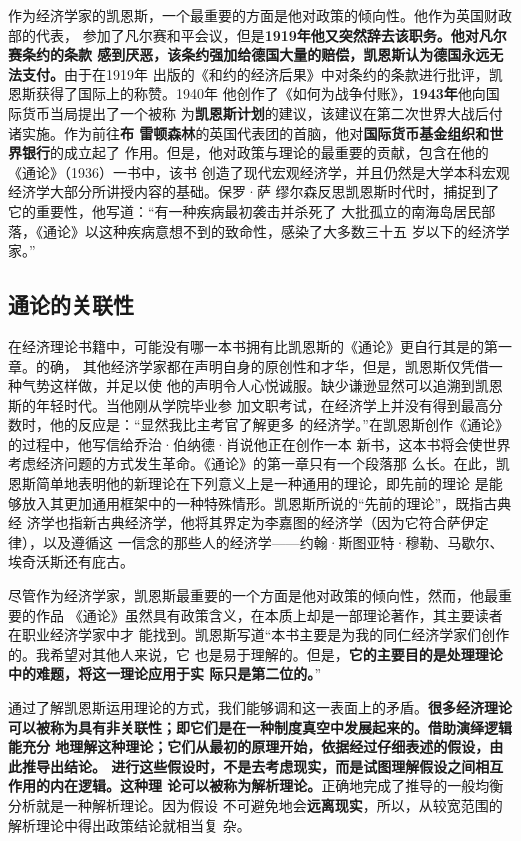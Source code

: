 作为经济学家的凯恩斯，一个最重要的方面是他对政策的倾向性。他作为英国财政部的代表，
参加了凡尔赛和平会议，但是\textbf{1919年他又突然辞去该职务。他对凡尔赛条约的条款
  感到厌恶，该条约强加给德国大量的赔偿，凯恩斯认为德国永远无法支付。}由于在1919年
出版的《和约的经济后果》中对条约的条款进行批评，凯恩斯获得了国际上的称赞。1940年
他创作了《如何为战争付账》，\textbf{1943年}他向国际货币当局提出了一个被称
为\textbf{凯恩斯计划}的建议，该建议在第二次世界大战后付诸实施。作为前往\textbf{布
  雷顿森林}的英国代表团的首脑，他对\textbf{国际货币基金组织和世界银行}的成立起了
作用。但是，他对政策与理论的最重要的贡献，包含在他的《通论》（1936）一书中，该书
创造了现代宏观经济学，并且仍然是大学本科宏观经济学大部分所讲授内容的基础。保罗·萨
缪尔森反思凯恩斯时代时，捕捉到了它的重要性，他写道：“有一种疾病最初袭击并杀死了
大批孤立的南海岛居民部落，《通论》以这种疾病意想不到的致命性，感染了大多数三十五
岁以下的经济学家。”

\subsection{通论的关联性}

在经济理论书籍中，可能没有哪一本书拥有比凯恩斯的《通论》更自行其是的第一章。的确，
其他经济学家都在声明自身的原创性和才华，但是，凯恩斯仅凭借一种气势这样做，并足以使
他的声明令人心悦诚服。缺少谦逊显然可以追溯到凯恩斯的年轻时代。当他刚从学院毕业参
加文职考试，在经济学上并没有得到最高分数时，他的反应是：“显然我比主考官了解更多
的经济学。”在凯恩斯创作《通论》的过程中，他写信给乔治·伯纳德·肖说他正在创作一本
新书，这本书将会使世界考虑经济问题的方式发生革命。《通论》的第一章只有一个段落那
么长。在此，凯恩斯简单地表明他的新理论在下列意义上是一种通用的理论，即先前的理论
是能够放入其更加通用框架中的一种特殊情形。凯恩斯所说的“先前的理论”，既指古典经
济学也指新古典经济学，他将其界定为李嘉图的经济学（因为它符合萨伊定律），以及遵循这
一信念的那些人的经济学——约翰·斯图亚特·穆勒、马歇尔、埃奇沃斯还有庇古。

尽管作为经济学家，凯恩斯最重要的一个方面是他对政策的倾向性，然而，他最重要的作品
《通论》虽然具有政策含义，在本质上却是一部理论著作，其主要读者在职业经济学家中才
能找到。凯恩斯写道“本书主要是为我的同仁经济学家们创作的。我希望对其他人来说，它
也是易于理解的。但是，\textbf{它的主要目的是处理理论中的难题，将这一理论应用于实
  际只是第二位的。}”

通过了解凯恩斯运用理论的方式，我们能够调和这一表面上的矛盾。\textbf{很多经济理论
  可以被称为具有非关联性；即它们是在一种制度真空中发展起来的。借助演绎逻辑能充分
  地理解这种理论；它们从最初的原理开始，依据经过仔细表述的假设，由此推导出结论。
  进行这些假设时，不是去考虑现实，而是试图理解假设之间相互作用的内在逻辑。这种理
  论可以被称为解析理论。}正确地完成了推导的一般均衡分析就是一种解析理论。因为假设
不可避免地会\textbf{远离现实}，所以，从较宽范围的解析理论中得出政策结论就相当复
杂。


